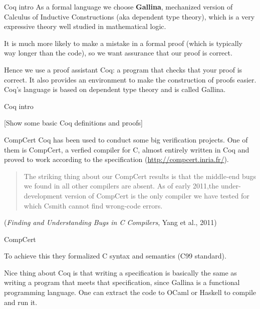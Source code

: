 \documentclass{beamer}
\begin{document}
\begin{frame}{Coq intro}
  As a formal language we choose {\bf Gallina}, mechanized version of Calculus of Inductive Constructions (aka dependent type theory), which is a very expressive theory well studied in mathematical logic.


  \smallskip
  
  It is much more likely to make a mistake in a formal proof (which is typically way longer than the code), so we want assurance that our proof is correct.
  \smallskip
  
  Hence we use a proof assistant Coq: a program that checks that your proof is correct. It also provides an environment to make the construction of proofs easier. Coq's language is based on dependent type theory and is called Gallina.
  
\end{frame}
\begin{frame}{Coq intro}
  
 [Show some basic Coq definitions and proofs]
  
  \end{frame}

  \begin{frame}{CompCert}
    Coq has been used to conduct some big verification projects. One of them is CompCert, a verfied compiler for C, almost entirely written in Coq and proved to work according to the specification (\url{http://compcert.inria.fr/}).

    \begin{quote}
      The striking thing about our CompCert results is that the middle-end bugs we found in all other compilers are absent. As of early 2011,the under-development version of CompCert is the only compiler we have tested for which Csmith cannot find wrong-code errors.
    \end{quote} ({\it Finding and Understanding Bugs in C Compilers}, Yang et al., 2011)

  \end{frame}
  \begin{frame}{CompCert}
    
 To achieve this they formalized C syntax and semantics (C99 standard).

    \bigskip
    
    Nice thing about Coq is that writing a specification is basically the same as writing a program that meets that specification, since Gallina is a functional programming language. One can extract the code to OCaml or Haskell to compile and run it.

    
    
\end{frame}
\end{document}
